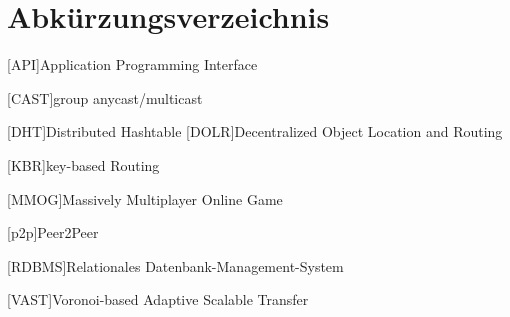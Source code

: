 \chapter*{Abkürzungsverzeichnis}

\pagestyle{useheadings}

\vspace{\topskip}


\begin{acronym}[xxxxxxxxxxxx]
	\setlength{\itemsep}{-\parsep}
	\setlength{\itemindent}{1.5em}
	[API]{Application Programming Interface}

	\vspace{\parsep} 
 [CAST]{group anycast/multicast}

	\vspace{\parsep}
	 [DHT]{Distributed Hashtable}
	[DOLR]{Decentralized Object Location and Routing}



	
	
\vspace{\parsep}
[KBR]{key-based Routing}




	\vspace{\parsep}
	[MMOG]{Massively Multiplayer Online Game}


	
	\vspace{\parsep}
	[p2p]{Peer2Peer}

	

	[RDBMS]{Relationales Datenbank-Management-System}
	
	


	\vspace{\parsep}
	[VAST]{Voronoi-based Adaptive Scalable Transfer}





\end{acronym}

